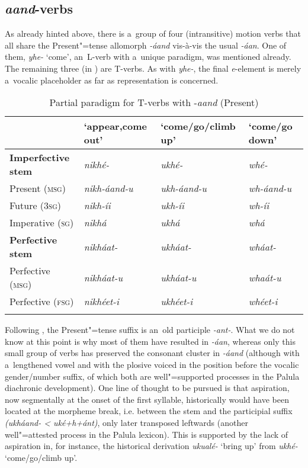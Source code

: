 \subsection{\textit{aand}-verbs}
\label{subsec:8-3-8}


As already hinted above, there is a~group of four (intransitive) motion verbs that all share the Present"=tense allomorph \textit{-áand} vis-à-vis the usual \textit{-áan}. One of them, \textit{yhe-} `come', an~L-verb with a~unique paradigm, was mentioned already. The remaining three (in ) are T-verbs. As with \textit{yhe-}, the final \textit{e}-element is merely a~vocalic placeholder as far as representation is concerned.


\begin{table}[ht]
\caption{Partial paradigm for T-verbs with -\textit{aand} (Present)}
\begin{tabularx}{\textwidth}{ l Q Q Q }
\lsptoprule
&
`appear,\newline come out' &
`come/go/\newline climb up' &
`come/go down'\\\hline
\textbf{Imperfective stem} &
\textit{nikhé- } &
\textit{ukhé-} &
\textit{whé-} \\
Present (\textsc{msg}) &
\textit{nikh-áand-u} &
\textit{ukh-áand-u} &
\textit{wh-áand-u} \\
Future (\textsc{3sg}) &
\textit{nikh-íi} &
\textit{ukh-íi} &
\textit{wh-íi} \\
Imperative (\textsc{sg}) &
\textit{nikhá} &
\textit{ukhá} &
\textit{whá} \\
\textbf{Perfective stem} &
\textit{nikháat-} &
\textit{ukháat-} &
\textit{wháat-} \\
Perfective (\textsc{msg}) &
\textit{nikháat-u} &
\textit{ukháat-u} &
\textit{whaát-u} \\
Perfective (\textsc{fsg}) &
\textit{nikhéet-i} &
\textit{ukhéet-i} &
\textit{whéet-i} \\\lspbottomrule
\end{tabularx}
\label{tab:8-10}
\end{table}


Following \citet[22]{morgenstierne1941}, the Present"=tense suffix is an~old participle \textit{-ant-}. What we do not know at this point is why most of them have resulted in \textit{-áan}, whereas only this small group of verbs has preserved the consonant cluster in \textit{-áand} (although with a~lengthened vowel and with the plosive voiced in the position before the vocalic gender/number suffix, of which both are well"=supported processes in the Palula diachronic development). One line of thought to be pursued is that aspiration, now segmentally at the onset of the first syllable, historically would have been located at the morpheme break, i.e. between the stem and the participial suffix \textit{(ukháand- {\textless} uké+h+ánt)}, only later transposed leftwards (another well"=attested process in the Palula lexicon). This is supported by the lack of aspiration in, for instance, the historical derivation \textit{ukualé-} `bring up' from \textit{ukhé-} `come/go/climb up'.


